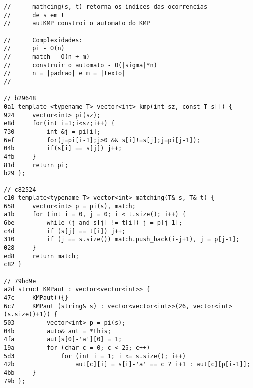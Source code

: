 \documentclass[11pt, a4paper, twoside]{article}
\begin{document}
\subsection{	}
\begin{lstlisting}

//      mathcing(s, t) retorna os indices das ocorrencias
//      de s em t
//      autKMP constroi o automato do KMP

//      Complexidades:
//      pi - O(n)
//      match - O(n + m)
//      construir o automato - O(|sigma|*n)
//      n = |padrao| e m = |texto|
//

// b29648
0a1 template <typename T> vector<int> kmp(int sz, const T s[]) {
924 	vector<int> pi(sz);
e8d 	for(int i=1;i<sz;i++) {
730 		int &j = pi[i];
6ef 		for(j=pi[i-1];j>0 && s[i]!=s[j];j=pi[j-1]);
04b 		if(s[i] == s[j]) j++;
4fb 	}
81d 	return pi;
b29 };

// c82524
c10 template<typename T> vector<int> matching(T& s, T& t) {
658 	vector<int> p = pi(s), match;
a1b 	for (int i = 0, j = 0; i < t.size(); i++) {
6be 		while (j and s[j] != t[i]) j = p[j-1];
c4d 		if (s[j] == t[i]) j++;
310 		if (j == s.size()) match.push_back(i-j+1), j = p[j-1];
028 	}
ed8 	return match;
c82 }

// 79bd9e
a2d struct KMPaut : vector<vector<int>> {
47c 	KMPaut(){}
6c7 	KMPaut (string& s) : vector<vector<int>>(26, vector<int>(s.size()+1)) {
503 		vector<int> p = pi(s);
04b 		auto& aut = *this;
4fa 		aut[s[0]-'a'][0] = 1;
19a 		for (char c = 0; c < 26; c++)
5d3 			for (int i = 1; i <= s.size(); i++)
42b 				aut[c][i] = s[i]-'a' == c ? i+1 : aut[c][p[i-1]];
4bb 	}
79b };
\end{lstlisting}
\end{document}
